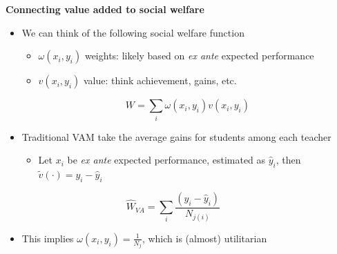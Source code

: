 \documentclass[t,aspectratio=169,11pt,presentation]{beamer}
\begin{document}
\begin{frame}{\textbf{Connecting value added to social welfare}}

\begin{itemize}
    \item We can think of the following social welfare function
    \begin{itemize}
        \item $\omega(x_i,y_i)$ weights: likely based on \textit{ex ante} expected performance
        \item $v(x_i,y_i)$ value: think achievement, gains, etc.
    \end{itemize}
    \[
    W  = \sum_i \omega(x_i,y_i) v(x_i,y_i) 
    \] 
    
    \item Traditional VAM take the average gains for students among each teacher
    \begin{itemize}
        \item Let $x_i$ be \textit{ex ante} expected performance, estimated as $\hat{y}_i$, then $\tilde{v}(\cdot) = y_i - \hat{y}_i$
    \end{itemize}
    \[
    \hat{W}_{VA}  = \sum_i \frac{(y_i-\hat{y}_i)}{N_{j(i)}} \hspace{3em}
    \]
    
    \item This implies $\omega(x_i,y_i)=\frac{1}{N_j}$, which is (almost) utilitarian

\end{itemize}


\end{frame}

\end{document}
